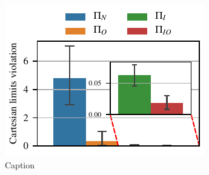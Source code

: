 \begin{figure}[t]
    \centering
    \includegraphics[width=\columnwidth]{figures/obstacle_avoidance_test.pdf}
    \caption{Caption}
    \label{fig:tank_experiment}
\end{figure}